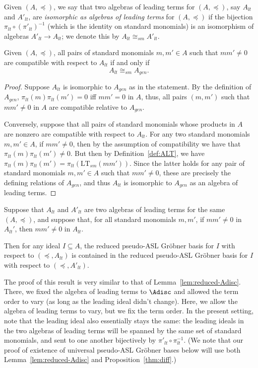 \documentclass[11pt,reqno]{amsart}
\newcommand{\ltsm}{\text{LT}_{sm}}
\theoremstyle{definition}
\numberwithin{equation}{section}
\begin{document}
Given $(A, \preceq)$, we say that two algebras of leading terms for $(A,\preceq)$, say $A_{lt}$ and $A'_{lt}$, are \emph{isomorphic as algebras of leading terms} for $(A,\preceq)$ if the bijection $\pi_{lt} \circ (\pi'_{lt})^{-1}$ (which is the identity on standard monomials) is an isomorphism of algebras $A'_{lt} \to A_{lt}$; we denote this by $A_{lt} \cong_{sm} A'_{lt}$.

\begin{proposition} \label{prop:Agen}
Given $(A,\preceq)$, all pairs of standard monomials $m,m' \in A$ such that $mm' \neq 0$ are compatible with respect to $A_{lt}$ if and only if \[A_{lt} \cong_{sm} A_{gen}.\]
\end{proposition}

\begin{proof}
Suppose $A_{lt}$ is isomorphic to $A_{gen}$ as in the statement. By the definition of $A_{gen}$, $\pi_{lt}(m)\pi_{lt}(m') = 0$ iff $mm' = 0$ in $A$, thus, all pairs $(m,m')$ such that $mm' \neq 0$ in $A$ are compatible relative to $A_{gen}$.

Conversely, suppose that all pairs of standard monomials whose products in $A$ are nonzero are compatible with respect to $A_{lt}$. For any two standard monomials $m,m' \in A$, if $mm' \neq 0$, then by the assumption of compatibility we have that $\pi_{lt}(m) \pi_{lt}(m') \neq 0$. But then by Definition~\ref{def:ALT}, we have $\pi_{lt}(m) \pi_{lt}(m') = \pi_{lt}(\ltsm(mm'))$. Since the latter holds for any pair of standard monomials $m,m' \in A$ such that $mm' \neq 0$, these are precisely the defining relations of $A_{gen}$, and thus $A_{lt}$ is isomorphic to $A_{gen}$ as an algebra of leading terms.
\end{proof}

\begin{proposition} \label{thm:diff}
Suppose that $A_{lt}$ and $A'_{lt}$ are two algebras of leading terms for the same $(A,\preceq)$, and suppose that, for all standard monomials $m,m'$, if $mm' \neq 0$ in $A_{lt}'$, then $mm' \neq 0$ in $A_{lt}$. 

Then for any ideal $I \subseteq A$, the reduced pseudo-ASL Gröbner basis for $I$ with respect to $(\preceq,A_{lt})$ is contained in the reduced pseudo-ASL Gröbner basis for $I$ with respect to $(\preceq,A'_{lt})$. 
\end{proposition}

The proof of this result is very similar to that of Lemma~\ref{lem:reduced-Adisc}. There, we fixed the algebra of leading terms to $\Adisc$ and allowed the term order to vary (as long as the leading ideal didn't change). Here, we allow the algebra of leading terms to vary, but we fix the term order. In the present setting, note that the leading ideal also essentially stays the same: the leading ideals in the two algebras of leading terms will be spanned by the same set of standard monomials, and sent to one another bijectively by $\pi'_{lt} \circ \pi_{lt}^{-1}$. (We note that our proof of existence of universal pseudo-ASL Gröbner bases below will use both Lemma~\ref{lem:reduced-Adisc} and Proposition~\ref{thm:diff}.)
\end{document}

